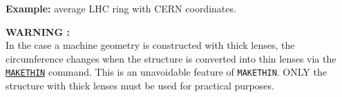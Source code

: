 \textbf{Example:} average LHC ring with CERN coordinates.


\textbf{WARNING :}\\
In the case a machine geometry is constructed with thick lenses, the
circumference changes when the structure is converted into thin lenses
via the \hyperref[chap:makethin]{\texttt{MAKETHIN}} command. This is an
unavoidable feature of \texttt{MAKETHIN}. ONLY the structure with thick
lenses must be used for practical purposes.




